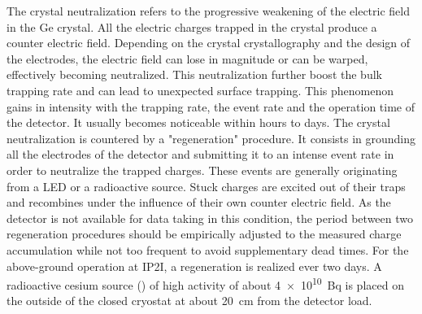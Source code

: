 The crystal neutralization refers to the progressive weakening of the electric field in the Ge crystal. All the electric charges trapped in the crystal produce a counter electric field. Depending on the crystal crystallography and the design of the electrodes, the electric field can lose in magnitude or can be warped, effectively becoming neutralized. This neutralization further boost the bulk trapping rate and can lead to unexpected surface trapping.
This phenomenon gains in intensity with the trapping rate, the event rate and the operation time of the detector. It usually becomes noticeable within hours to days. The crystal neutralization is countered by a "regeneration" procedure. It consists in grounding all the electrodes of the detector and submitting it to an intense event rate in order to neutralize the trapped charges. These events are generally originating from a LED or a radioactive source. Stuck charges are excited out of their traps and recombines under the influence of their own counter electric field. As the detector is not available for data taking in this condition, the period between two regeneration procedures should be empirically adjusted to the measured charge accumulation while not too frequent to avoid supplementary dead times. For the above-ground operation at IP2I, a regeneration is realized ever two days. A radioactive cesium  source () of high activity of about \SI{4e10}{\becquerel} is placed on the outside of the closed cryostat at about \SI{20}{\cm} from the detector load.




